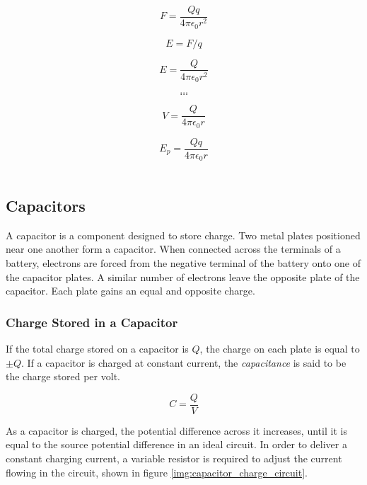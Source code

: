 \documentclass[12pt]{article}
\begin{document}
\begin{figure}[H]
\vspace{5mm}
\centering
\begin{minipage}{0.8\textwidth}
\begin{tcolorbox}[
sharp corners=all,
colback=white,
colframe=white,
size=tight,
boxrule=0.2mm,
left=10mm, right=10mm,
]
\begin{multicols}{2}
\noindent
\[F = \dfrac{Qq}{4 \pi \epsilon_0r^2}\]

\[E = F/q\]

\[E = \dfrac{Q}{4 \pi \epsilon_0r^2}\]

\[\textbf{\ldots}\]
\columnbreak
\[\textbf{\ldots}\]

\[V = \dfrac{Q}{4 \pi \epsilon_0r}\]

\[E_p = \dfrac{Qq}{4 \pi \epsilon_0r}\]
\\

\end{multicols}
\end{tcolorbox}
\end{minipage}
\label{equ:e_field}
\end{figure}

\subsection{Capacitors}
\label{sec:org4d06d2b}

A capacitor is a component designed to store charge. Two metal plates positioned near one another form a capacitor. When connected across the terminals of a battery, electrons are forced from the negative terminal of the battery onto one of the capacitor plates. A similar number of electrons leave the opposite plate of the capacitor. Each plate gains an equal and opposite charge.

\subsubsection{Charge Stored in a Capacitor}
\label{sec:org91a4584}

If the total charge stored on a capacitor is \(Q\), the charge on each plate is equal to \(\pm Q\). If a capacitor is charged at constant current, the \emph{capacitance} is said to be the charge stored per volt.

\[C = \dfrac{Q}{V}\]

As a capacitor is charged, the potential difference across it increases, until it is equal to the source potential difference in an ideal circuit. In order to deliver a constant charging current, a variable resistor is required to adjust the current flowing in the circuit, shown in figure \ref{img:capacitor_charge_circuit}.
\end{document}
